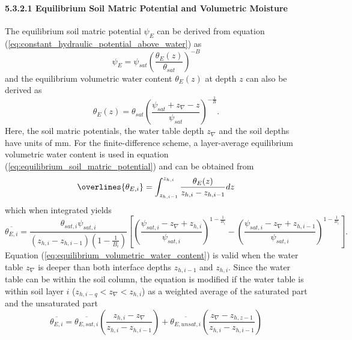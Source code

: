 \documentclass[12pt,authoryear]{elsarticle}
\numberwithin{equation}{section} %
\begin{document}
\paragraph{5.3.2.1 Equilibrium Soil Matric Potential and Volumetric Moisture}
%
The equilibrium soil matric potential $\psi_{E}$ can be derived from equation (\ref{eq:constant_hydraulic_potential_above_water}) as
\begin{equation}
\label{eq:equilibrium_soil_matric_potential}
\psi_{E} = \psi_{sat} \left(\frac{\theta_{E}(z)}{\theta_{sat}}\right)^{-B}
\end{equation}
and the equilibrium volumetric water content $\theta_{E}(z)$ at depth $z$ can also be derived as
\begin{equation}
\theta_{E}(z)=\theta_{sat}\left(\frac{\psi_{sat}+z_{\nabla}-z}{\psi_{sat}}\right)^{-\frac{1}{B}}.
\end{equation}
Here, the soil matric potentials, the water table depth $z_{\nabla}$ and the soil depths have units of
mm. For the finite-difference scheme, a layer-average equilibrium volumetric water content is used in equation (\ref{eq:equilibrium_soil_matric_potential}) and can be obtained from
\begin{equation}
\overlines{\theta_{E,i}} = \int_{z_{h,i-1}}^{z_{h,i}}\frac{\theta_{E}(z)}{z_{h,i}-z_{h,i-1}}dz
\end{equation}
which when integrated yields
\begin{equation}
\label{eq:equilibrium_volumetric_water_content}
\overline{\theta_{E,i}} = \frac{\theta_{sat,i}\psi_{sat,i}}{(z_{h,i}-z_{h,i-1})(1-\frac{1}{B_{i}})}\left[\left(\frac{\psi_{sat,i}-z_{\nabla}+z_{h,i}}{\psi_{sat,i}}\right)^{1-\frac{1}{B_{i}}}-\left(\frac{\psi_{sat,i}-z_{\nabla}+z_{h,i-1}}{\psi_{sat,i}}\right)^{1-\frac{1}{B_{i}}}\right].
\end{equation}
Equation (\ref{eq:equilibrium_volumetric_water_content}) is valid when the water table $z_{\nabla}$ is deeper than both interface depths $z_{h,i-1}$ and $z_{h,i}$. Since the water table can be within the soil column, the equation is modified if the water table is within soil layer $i$ ($z_{h,i-q}<z_{\nabla}<z_{h,i}$) as a weighted average of the saturated part and the unsaturated part
\begin{equation}
\overline{\theta_{E,i}}=\overline{\theta_{E,sat,i}}\left(\frac{z_{h,i}-z_{\nabla}}{z_{h,i}-z_{h,i-1}}\right)+\overline{\theta_{E,unsat,i}}\left(\frac{z_{\nabla}-z_{h,z-1}}{z_{h,i}-z_{h,i-1}}\right)
\end{equation}
\end{document}
